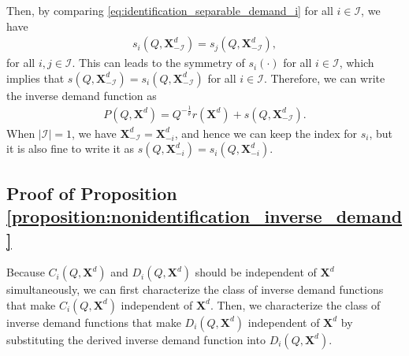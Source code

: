 \documentclass[11pt, a4paper]{article}
\begin{document}
Then, by comparing \eqref{eq:identification_separable_demand_i} for all $i \in \mathcal{I}$, we have
\begin{align}
    s_i(Q, \bm{X}^{d}_{-\mathcal{I}}) = s_j(Q, \bm{X}^{d}_{-\mathcal{I}}),
\end{align}
for all $i,j \in \mathcal{I}$.
This can leads to the symmetry of $s_i(\cdot)$ for all $i \in \mathcal{I}$,
which implies that $s(Q, \bm{X}^{d}_{-\mathcal{I}}) = s_i(Q, \bm{X}^{d}_{-\mathcal{I}})$ for all $i \in \mathcal{I}$.
Therefore, we can write the inverse demand function as
\begin{align}
    P(Q, \bm{X}^{d}) = Q^{-\frac{1}{\theta}}r(\bm{X}^{d}) + s(Q, \bm{X}^{d}_{-\mathcal{I}}).
\end{align}
When $|\mathcal{I}| = 1$, we have $\bm{X}^{d}_{-\mathcal{I}} = \bm{X}^{d}_{-i}$, and hence we can keep the index for $s_i$, but it is also fine to write it as $s(Q, \bm{X}^{d}_{-i}) = s_i(Q, \bm{X}^{d}_{-i})$.




\subsection{Proof of Proposition \ref{proposition:nonidentification_inverse_demand}}


Because $C_i(Q, \bm{X}^{d})$ and $D_i(Q, \bm{X}^{d})$ should be independent of $\bm{X}^{d}$ simultaneously, we can first characterize the class of inverse demand functions that make $C_i(Q, \bm{X}^{d})$ independent of $\bm{X}^{d}$.
Then, we characterize the class of inverse demand functions that make $D_i(Q, \bm{X}^{d})$ independent of $\bm{X}^{d}$ by substituting the derived inverse demand function into $D_i(Q, \bm{X}^{d})$.
\end{document}

